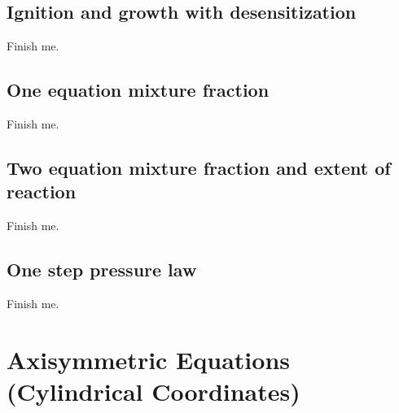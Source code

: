 \documentclass{article}
\begin{document}
\subsection{Ignition and growth with desensitization} \label{sec:ignitionAndGrowthWithDesensitization}

Finish me.
\subsection{One equation mixture fraction} \label{sec:oneEquationMixtureFraction}

Finish me.
\subsection{Two equation mixture fraction and extent of reaction} \label{sec:twoEquationMixtureFraction}

Finish me.
\subsection{One step pressure law} \label{sec:oneStepPressureLaw}

Finish me.




\clearpage
\section{Axisymmetric Equations (Cylindrical Coordinates)}\label{sec:axisymmetricEquations}
\end{document}
